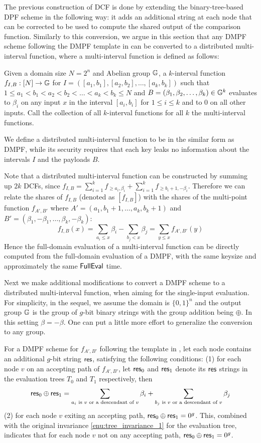The previous construction of DCF is done by extending the binary-tree-based DPF scheme in the following way: it adds an additional string at each node that can be corrected to be used to compute the shared output of the comparison function. Similarly to this conversion, we argue in this section that any DMPF scheme following the DMPF template in  can be converted to a distributed multi-interval function, where a multi-interval function is defined as follows: 
\begin{definition}
  Given a domain size $N=2^n$ and Abelian group $\mathbb{G}$, a $k$-interval function $f_{I,B}:[N]\rightarrow \mathbb{G}$ for $I = \left([a_1,b_1], [a_2,b_2], \dots, [a_k,b_k]\right)$ such that $1\le a_1<b_1<a_2<b_2<\dots<a_k<b_k\le N$ and $B = (\beta_1,\beta_2,\dots,\beta_k)\in \mathbb{G}^k$ evaluates to $\beta_i$ on any input $x$ in the interval $[a_i,b_i]$ for $1\le i\le k$ and to $0$ on all other inputs. Call the collection of all $k$-interval functions for all $k$ the multi-interval functions. 
\end{definition}
We define a distributed multi-interval function to be in the similar form as DMPF, while its security requires that each key leaks no information about the intervals $I$ and the payloads $B$. 

Note that a distributed multi-interval function can be constructed by summing up $2k$ DCFs, since $f_{I,B} = \sum_{i=1}^k f_{\ge a_i,\beta_i} + \sum_{i=1}^k f_{\ge b_i+1, -\beta_i}$. Therefore we can relate the shares of $f_{I,B}$ (denoted as $[f_{I,B}]$) with the shares of the multi-point function $f_{A',B'}$ where $A' = (a_1,b_1+1,\dots,a_k,b_k+1)$ and $B' = (\beta_1,-\beta_1,\dots,\beta_k,-\beta_k)$: 
\[
  f_{I,B}(x)  = \sum_{a_i\le x}\beta_i - \sum_{b_j<x}\beta_j = \sum_{y\le x}f_{A',B'}(y)
\]
Hence the full-domain evaluation of a multi-interval function can be directly computed from the full-domain evaluation of a DMPF, with the same keysize and approximately the same ${\sf FullEval}$ time. 

Next we make additional modifications to convert a DMPF scheme to a distributed multi-interval function, when aiming for the single-input evaluation. For simplicity, in the sequel, we assume the domain is $\{0,1\}^n$ and the output group $\mathbb{G}$ is the group of $g$-bit binary strings with the group addition being $\oplus$. In this setting $\beta = -\beta$. One can put a little more effort to generalize the conversion to any group. 

For a DMPF scheme for $f_{A',B'}$ following the template in , let each node contains an additional $g$-bit string ${\sf res}$, satisfying the following conditions: (1) for each node $v$ on an accepting path of $f_{A',B'}$, let ${\sf res}_0$ and ${\sf res}_1$ denote its ${\sf res}$ strings in the evaluation trees $T_0$ and $T_1$ respectively, then 
\[
  {\sf res}_0\oplus {\sf res}_1 = \sum_{a_i\text{ is }v\text{ or a descendant of }v}\beta_i + \sum_{b_j\text{ is }v\text{ or a descendant of }v}\beta_j 
\]
(2) for each node $v$ exiting an accepting path, ${\sf res}_0\oplus {\sf res}_1 = 0^g$. This, combined with the original invariance \ref{enu:tree_invariance_1} for the evaluation tree, indicates that for each node $v$ not on any accepting path, ${\sf res}_0\oplus {\sf res}_1 = 0^g$. 

